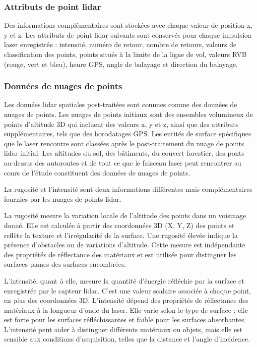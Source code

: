 \subsubsection{Attributs de point \gls{lidar}}

Des informations complémentaires sont stockées avec chaque valeur de position x, y et z. Les attributs de point \gls{lidar} suivants sont conservés pour chaque impulsion laser enregistrée : intensité, numéro de retour, nombre de retours, valeurs de classification des points, points situés à la limite de la ligne de vol, valeurs RVB (rouge, vert et bleu), heure GPS, angle de balayage et direction du balayage.

\subsubsection{Données de nuages de points}

Les données \gls{lidar} spatiales post-traitées sont connues comme des données de nuages de points. Les nuages de points initiaux sont des ensembles volumineux de points d'altitude 3D qui incluent des valeurs x, y et z, ainsi que des attributs supplémentaires, tels que des horodatages GPS. Les entités de surface spécifiques que le laser rencontre sont classées après le post-traitement du nuage de points \gls{lidar} initial. Les altitudes du sol, des bâtiments, du couvert forestier, des ponts au-dessus des autoroutes et de tout ce que le faisceau laser peut rencontrer au cours de l'étude constituent des données de nuages de points.

La rugosité et l'intensité sont deux informations différentes mais complémentaires fournies par les nuages de points \gls{lidar}.

La rugosité mesure la variation locale de l'altitude des points dans un voisinage donné. Elle est calculée à partir des coordonnées 3D (X, Y, Z) des points et reflète la texture et l'irrégularité de la surface. Une rugosité élevée indique la présence d'obstacles ou de variations d'altitude. Cette mesure est indépendante des propriétés de réflectance des matériaux et est utilisée pour distinguer les surfaces planes des surfaces encombrées.

L'intensité, quant à elle, mesure la quantité d'énergie réfléchie par la surface et enregistrée par le capteur \gls{lidar}. C'est une valeur scalaire associée à chaque point, en plus des coordonnées 3D. L'intensité dépend des propriétés de réflectance des matériaux à la longueur d'onde du laser. Elle varie selon le type de surface : elle est forte pour les surfaces réfléchissantes et faible pour les surfaces absorbantes. L'intensité peut aider à distinguer différents matériaux ou objets, mais elle est sensible aux conditions d'acquisition, telles que la distance et l'angle d'incidence.

